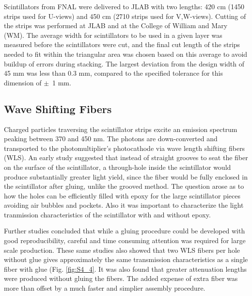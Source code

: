 Scintillators from FNAL were delivered to JLAB with two lengths: 420 cm (1450 strips used for U-views) and 450 cm (2710 strips used for V,W-views).   Cutting of the strips was performed at JLAB and at the College of William and Mary (WM). The average width for scintillators to be used in a given layer was measured before the scintillators were cut, and the final cut length of the strips needed to fit within the triangular area was chosen based on this average to avoid buildup of errors during stacking.  The largest deviation from the design width of 45 mm was less than 0.3 mm, compared to the specified  tolerance for this dimension of $\pm$~1 mm.

\subsection{Wave Shifting Fibers}
Charged particles traversing the scintillator strips excite an emission spectrum peaking between 370 and 450 nm. The photons are down-converted and transported to the photomultiplier’s photocathode via wave length shifting fibers (WLS). An early study \cite{2009018} suggested that instead of straight grooves to seat the fiber on the surface of the scintillator, a through-hole inside the scintillator would produce substantially greater light yield, since the fiber would be fully enclosed in the scintillator after gluing, unlike the grooved method.  The question arose as to how the holes can be efficiently filled with epoxy for the large scintillator pieces avoiding air bubbles and pockets. Also it was important to characterize the light tranmission characteristics of the scintillator with and without epoxy.

Further studies \cite{2010012} concluded that while a gluing procedure could be developed with good reproducibility, careful and time consuming attention was required for large scale production.  These same studies also showed that two WLS fibers per hole without glue gives approximately the same transmission characteristics as a single fiber with glue (Fig. \ref{fig:S4_4}.  It was also found that greater attenuation lengths were produced without gluing the fibers. The added expense of extra fiber was more than offset by a much faster and simplier assembly procedure. 


